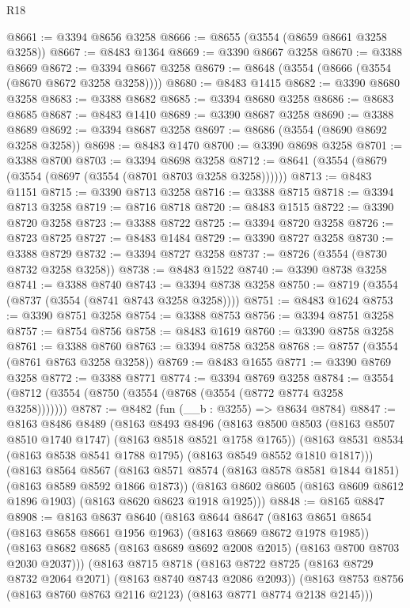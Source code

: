 \begin{lexlean}{R18}
\begin{coremodule}
@8661 := @3394 @8656 @3258
@8666 := @8655 (@3554 (@8659 @8661 @3258 @3258))
@8667 := @8483 @1364
@8669 := @3390 @8667 @3258
@8670 := @3388 @8669
@8672 := @3394 @8667 @3258
@8679 := @8648 (@3554 (@8666 (@3554 (@8670 @8672 @3258 @3258))))
@8680 := @8483 @1415
@8682 := @3390 @8680 @3258
@8683 := @3388 @8682
@8685 := @3394 @8680 @3258
@8686 := @8683 @8685
@8687 := @8483 @1410
@8689 := @3390 @8687 @3258
@8690 := @3388 @8689
@8692 := @3394 @8687 @3258
@8697 := @8686 (@3554 (@8690 @8692 @3258 @3258))
@8698 := @8483 @1470
@8700 := @3390 @8698 @3258
@8701 := @3388 @8700
@8703 := @3394 @8698 @3258
@8712 := @8641 (@3554 (@8679 (@3554 (@8697 (@3554 (@8701 @8703 @3258 @3258))))))
@8713 := @8483 @1151
@8715 := @3390 @8713 @3258
@8716 := @3388 @8715
@8718 := @3394 @8713 @3258
@8719 := @8716 @8718
@8720 := @8483 @1515
@8722 := @3390 @8720 @3258
@8723 := @3388 @8722
@8725 := @3394 @8720 @3258
@8726 := @8723 @8725
@8727 := @8483 @1484
@8729 := @3390 @8727 @3258
@8730 := @3388 @8729
@8732 := @3394 @8727 @3258
@8737 := @8726 (@3554 (@8730 @8732 @3258 @3258))
@8738 := @8483 @1522
@8740 := @3390 @8738 @3258
@8741 := @3388 @8740
@8743 := @3394 @8738 @3258
@8750 := @8719 (@3554 (@8737 (@3554 (@8741 @8743 @3258 @3258))))
@8751 := @8483 @1624
@8753 := @3390 @8751 @3258
@8754 := @3388 @8753
@8756 := @3394 @8751 @3258
@8757 := @8754 @8756
@8758 := @8483 @1619
@8760 := @3390 @8758 @3258
@8761 := @3388 @8760
@8763 := @3394 @8758 @3258
@8768 := @8757 (@3554 (@8761 @8763 @3258 @3258))
@8769 := @8483 @1655
@8771 := @3390 @8769 @3258
@8772 := @3388 @8771
@8774 := @3394 @8769 @3258
@8784 := @3554 (@8712 (@3554 (@8750 (@3554 (@8768 (@3554 (@8772 @8774 @3258 @3258)))))))
@8787 := @8482 (fun (__b : @3255) => @8634 @8784)
@8847 := @8163
    @8486
    @8489
    (@8163
      @8493
      @8496
      (@8163 @8500 @8503 (@8163 @8507 @8510 @1740 @1747) (@8163 @8518 @8521 @1758 @1765))
      (@8163 @8531 @8534 (@8163 @8538 @8541 @1788 @1795) (@8163 @8549 @8552 @1810 @1817)))
    (@8163
      @8564
      @8567
      (@8163 @8571 @8574 (@8163 @8578 @8581 @1844 @1851) (@8163 @8589 @8592 @1866 @1873))
      (@8163 @8602 @8605 (@8163 @8609 @8612 @1896 @1903) (@8163 @8620 @8623 @1918 @1925)))
@8848 := @8165 @8847
@8908 := @8163
    @8637
    @8640
    (@8163
      @8644
      @8647
      (@8163 @8651 @8654 (@8163 @8658 @8661 @1956 @1963) (@8163 @8669 @8672 @1978 @1985))
      (@8163 @8682 @8685 (@8163 @8689 @8692 @2008 @2015) (@8163 @8700 @8703 @2030 @2037)))
    (@8163
      @8715
      @8718
      (@8163 @8722 @8725 (@8163 @8729 @8732 @2064 @2071) (@8163 @8740 @8743 @2086 @2093))
      (@8163 @8753 @8756 (@8163 @8760 @8763 @2116 @2123) (@8163 @8771 @8774 @2138 @2145)))

\end{coremodule}
\end{lexlean}
